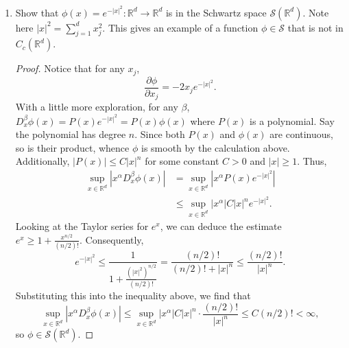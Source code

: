\documentclass[11pt,oneside,english]{amsart}
\theoremstyle{definition}
\newcommand{\ve}{\varepsilon}
\newcommand{\ess}{\text{ess sup}}
\newcommand{\pp}[2]{\frac{\partial{#1}}{\partial{#2}}}
\newcommand{\MC}[1]{\mathcal{#1}}
\newcommand{\MB}[1]{\mathbb{#1}}
\begin{document}
\begin{enumerate}
\begin{proof}
Next, we need to show that $\|g_\lambda-g\|_\infty\to0$ as $\lambda\to0$. We have

\begin{align*}
\|g_\lambda-g\|_\infty&=\ess_{x\in\MB{R}^d}|g_\lambda(x)-g(x)|\\[2mm]
&=\ess_{x\in\MB{R}^d}\left|\int_{B(0,\lambda)}g(x-y)-g(x)\phi_\lambda(y)\,dy-\int_{B(0,\lambda)}g(x)\phi_\lambda(y)\,dy\right|\\[2mm]
&=\ess_{x\in\MB{R}^d}\left|\int_{B(0,\lambda)}[g(x-y)-g(x)]\phi_\lambda(y)\,dy\right|\\[2mm]
&\leq\ess_{x\in\MB{R}^d}\int_{B(0,\lambda)}|g(x-y)-g(x)|\,|\phi_\lambda(y)|\,dy.
\end{align*}

Since $g$ is continuous, for any $\ve>0$, there exists a $\lambda>0$ sufficiently small such that whenever $|x-y|<\lambda$, $|g(x-y)-g(x)|<\ve$. Thus,

\begin{align*}
\ess_{x\in\MB{R}^d}\int_{B(0,\lambda)}|g(x-y)-g(x)|\,|\phi_\lambda(y)|\,dy&<\ve \cdot \ess_{x\in\MB{R}^d}\int_{B(0,\lambda)}|\phi_\lambda(y)|\,dy\\[2mm]
&<\ve \cdot1=\ve.
\end{align*}
Thus, $\|g_\lambda-g\|_\infty\to0$ as $\lambda\to0$.

\end{proof}


\item Show that $\phi(x)=e^{-|x|^2}:\MB{R}^d\to\MB{R}^d$ is in the Schwartz space $\MC{S}(\MB{R}^d)$. Note here $|x|^2=\sum_{j=1}^dx_j^2$. This gives an example of a function $\phi\in\MC{S}$ that is not in $C_c(\MB{R}^d)$.

\begin{proof}
Notice that for any $x_j$,
\[
\pp{\phi}{x_j}=-2x_je^{-|x|^2}.
\]
With a little more exploration, for any $\beta$, $D^\beta_x\phi(x)=P(x)e^{-|x|^2}=P(x)\phi(x)$ where $P(x)$ is a polynomial. Say the polynomial has degree $n$. Since both $P(x)$ and $\phi(x)$ are continuous, so is their product, whence $\phi$ is smooth by the calculation above. Additionally, $|P(x)|\leq C|x|^n$ for some constant $C>0$ and $|x|\geq1$. Thus,
\begin{align*}
\sup_{x\in\MB{R}^d}|x^\alpha D_x^\beta\phi(x)|&=\sup_{x\in\MB{R}^d}|x^\alpha P(x)e^{-|x|^2}|\\[2mm]
&\leq\sup_{x\in\MB{R}^d}|x^\alpha| C|x|^ne^{-|x|^2}.
\end{align*}
Looking at the Taylor series for $e^x$, we can deduce the estimate $e^x\geq1+\frac{x^{n/2}}{(n/2)!}$. Consequently,
\[
e^{-|x|^2}\leq\frac{1}{1+\frac{(|x|^2)^{n/2}}{(n/2)!}}=\frac{(n/2)!}{(n/2)!+|x|^{n}}\leq\frac{(n/2)!}{|x|^{n}}.
\]
Substituting this into the inequality above, we find that
\[
\sup_{x\in\MB{R}^d}|x^\alpha D_x^\beta\phi(x)|\leq\sup_{x\in\MB{R}^d}|x^\alpha| C|x|^n\cdot\frac{(n/2)!}{|x|^{n}}\leq C(n/2)!<\infty,
\]
so $\phi\in\MC{S}(\MB{R}^d)$.
\end{proof}



\end{enumerate}
\end{document}
